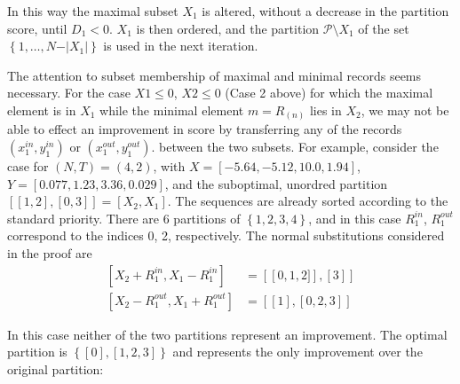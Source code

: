 \documentclass{article}
\theoremstyle{case}
\begin{document}
In this way the maximal subset $X_1$ is altered, without a decrease in the partition score, until $D_1 < 0$. $X_1$ is then ordered, and the partition $\mathcal{P} \setminus X_1$ of the set $\left\lbrace 1, \dots, N - \vert X_1\vert\right\rbrace$ is used in the next iteration.

\vspace{16pt}

The attention to subset membership of maximal and minimal records seems necessary. For the case $X1 \leq 0$, $X2 \leq 0$ (Case 2 above) for which the maximal element is in $X_1$ while the minimal element $m = R_{(n)}$ lies in $X_2$, we may not be able to effect an improvement in score by transferring any of the records $\left( x_1^{in}, y_1^{in}\right)$ or $\left( x_1^{out}, y_1^{out}\right)$. between the two subsets. For example, consider the case for $\left( N, T\right) = \left( 4, 2\right)$, with $X = [-5.64, -5.12, 10.0,  1.94]$, $Y = [0.077, 1.23 , 3.36, 0.029]$, and the suboptimal, unordred partition $\left[ \left[ 1, 2\right], \left[ 0, 3\right] \right] = \left[ X_2, X_1\right]$. The sequences are already sorted according to the standard priority. There are 6 partitions of $\left\lbrace 1, 2, 3, 4\right\rbrace$, and in this case $R_1^{in}$, $R_1^{out}$ correspond to the indices 0, 2, respectively. The normal substitutions considered in the proof are
\begin{align*}
\left[ X_2 + R_1^{in}, X_1 - R_1^{in}\right] & = \left[ \left[0,1,2] \right], \left[ 3\right] \right] \\
\left[ X_2 - R_1^{out}, X_1 + R_1^{out}\right] & = \left[ \left[ 1 \right], \left[ 0, 2, 3 \right] \right]
\end{align*}

In this case neither of the two partitions represent an improvement. The optimal partition is $\left\lbrace \left[ 0 \right], \left[ 1, 2, 3\right]\right\rbrace$ and represents the only improvement over the original partition:
\end{document}
